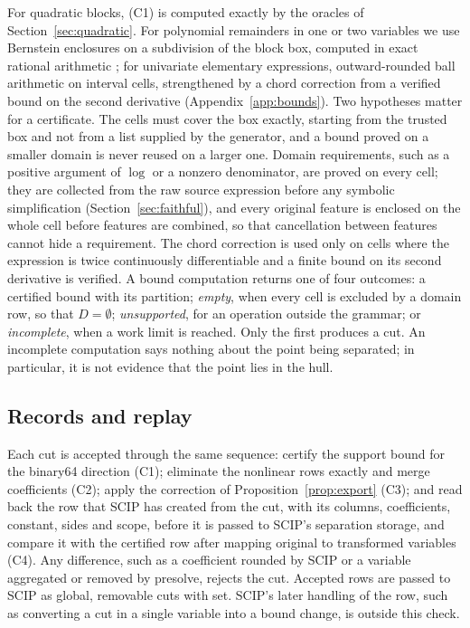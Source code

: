For quadratic blocks, (C1) is computed exactly by the oracles of
Section~\ref{sec:quadratic}. For polynomial remainders in one or two
variables we use Bernstein enclosures on a subdivision of the block box,
computed in exact rational arithmetic
\citep{GarloffJanssonSmith2003,GarloffSmith2008,MunozNarkawicz2013}; for
univariate elementary expressions, outward-rounded ball arithmetic
\citep{Johansson2017arb} on interval cells, strengthened by a chord
correction from a verified bound on the second derivative
(Appendix~\ref{app:bounds}). Two hypotheses matter for a certificate. The
cells must cover the box exactly, starting from the trusted box and not from
a list supplied by the generator, and a bound proved on a smaller domain is
never reused on a larger one. Domain requirements, such as a positive
argument of $\log$ or a nonzero denominator, are proved on every cell; they
are collected from the raw source expression before any symbolic
simplification (Section~\ref{sec:faithful}), and every original feature is
enclosed on the whole cell before features are combined, so that
cancellation between features cannot hide a requirement. The chord
correction is used only on cells where the expression is twice continuously
differentiable and a finite bound on its second derivative is verified. A
bound computation returns one of four outcomes: a certified bound with its
partition; \emph{empty}, when every cell is excluded by a domain row, so that
$D=\emptyset$; \emph{unsupported}, for an operation outside the grammar; or
\emph{incomplete}, when a work limit is reached. Only the first produces a
cut. An incomplete computation says nothing about the point being separated;
in particular, it is not evidence that the point lies in the hull.

\subsection{Records and replay}\label{sec:replay}

Each cut is accepted through the same sequence: certify the support bound for
the binary64 direction (C1); eliminate the nonlinear rows exactly and merge
coefficients (C2); apply the correction of Proposition~\ref{prop:export} (C3);
and read back the row that SCIP has created from the cut, with its columns,
coefficients, constant, sides and scope, before it is passed to SCIP's
separation storage, and compare it with the certified row after mapping
original to transformed variables (C4). Any difference, such as a coefficient
rounded by SCIP or a variable aggregated or removed by presolve, rejects the
cut. Accepted rows are passed to SCIP as global, removable cuts with
 set. SCIP's later handling of the row, such as converting a
cut in a single variable into a bound change, is outside this check.

